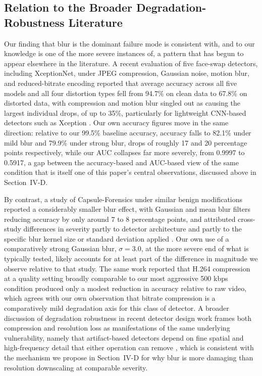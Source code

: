 \documentclass[conference]{IEEEtran}
\begin{document}
\subsection{Relation to the Broader Degradation-Robustness Literature}
Our finding that blur is the dominant failure mode is consistent with, and to our knowledge is one of the more severe instances of, a pattern that has begun to appear elsewhere in the literature. A recent evaluation of five face-swap detectors, including XceptionNet, under JPEG compression, Gaussian noise, motion blur, and reduced-bitrate encoding reported that average accuracy across all five models and all four distortion types fell from 94.7\% on clean data to 67.8\% on distorted data, with compression and motion blur singled out as causing the largest individual drops, of up to 35\%, particularly for lightweight CNN-based detectors such as Xception \cite{robustness2026}. Our own accuracy figures move in the same direction: relative to our 99.5\% baseline accuracy, accuracy falls to 82.1\% under mild blur and 79.9\% under strong blur, drops of roughly 17 and 20 percentage points respectively, while our AUC collapses far more severely, from 0.9997 to 0.5917, a gap between the accuracy-based and AUC-based view of the same condition that is itself one of this paper's central observations, discussed above in Section~IV-D.

By contrast, a study of Capsule-Forensics under similar benign modifications reported a considerably smaller blur effect, with Gaussian and mean blur filters reducing accuracy by only around 7 to 8 percentage points, and attributed cross-study differences in severity partly to detector architecture and partly to the specific blur kernel size or standard deviation applied \cite{benignmods2021}. Our own use of a comparatively strong Gaussian blur, $\sigma=3.0$, at the more severe end of what is typically tested, likely accounts for at least part of the difference in magnitude we observe relative to that study. The same work reported that H.264 compression at a quality setting broadly comparable to our most aggressive 500 kbps condition produced only a modest reduction in accuracy relative to raw video, which agrees with our own observation that bitrate compression is a comparatively mild degradation axis for this class of detector. A broader discussion of degradation robustness in recent detector design work frames both compression and resolution loss as manifestations of the same underlying vulnerability, namely that artifact-based detectors depend on fine spatial and high-frequency detail that either operation can remove \cite{loger2026}, which is consistent with the mechanism we propose in Section~IV-D for why blur is more damaging than resolution downscaling at comparable severity.
\end{document}
